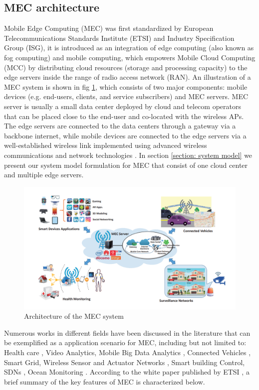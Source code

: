 \subsection{MEC architecture}
Mobile Edge Computing (MEC) was first standardized by European Telecommunications Standards Institute (ETSI) and Industry Specification Group (ISG), it is introduced as an integration of edge computing (also known as fog computing) and mobile computing, which empowers Mobile Cloud Computing (MCC) by distributing cloud resources (\eg storage and processing capacity) to the edge servers inside the range of radio access network (RAN). 
An illustration of a MEC system is shown in fig \ref{fig:MECachitecture}, which consists of two major components: mobile devices (e.g. end-users, clients, and service subscribers) and MEC servers. MEC server is usually
a small data center deployed by cloud and telecom operators that can be placed close to the end-user and co-located with the wireless APs. The edge servers are connected to the data centers through a gateway via a backbone internet, while mobile devices are connected to the edge servers via a well-established wireless link implemented using advanced wireless communications and network technologies \cite{MECsurvey}.
%
In section \ref{section: system model} we present our system model formulation for MEC that consist of one cloud center and multiple edge servers.
%
\begin{figure}
	\centering
	\includegraphics[width=0.9\linewidth]{figs/MEC architecture.PNG}
		\vspace{\baselineskip}
	\caption{Architecture of the MEC system \cite{MECsurvey}}
	\label{fig:MECachitecture}
\end{figure}

Numerous works in different fields have been discussed in the literature that can be exemplified as a application scenario for MEC, including but not limited to: Health care \cite{apphealthcare1}, Video Analytics\cite{appvideoanalytics1}, Mobile Big Data Analytics \cite{appmobilebigdata1}, Connected Vehicles \cite{appconnectedvehicles1}, Smart Grid\cite{appsmartgrid1}, Wireless Sensor and Actuator Networks \cite{appwsn1}, Smart building Control, SDNs \cite{appsdn1}, Ocean Monitoring \cite{appoceanmonotoring1}. According to the white paper published by ETSI \cite{MECwhitepaper}, a brief summary of the key features of MEC is characterized below.

